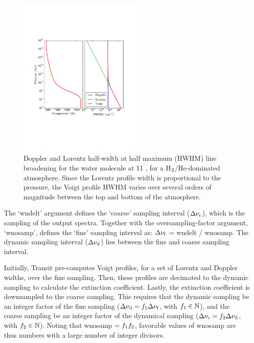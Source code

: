 \documentclass[letterpaper, 12pt]{article}
\begin{document}
\begin{figure}[htb]
\centerline{
\includegraphics[width=0.55\textwidth, clip]{figs/widths.pdf}}
\caption{\small \label{fig:broadening} Doppler and Lorentz half-width
  at half maximum (HWHM) line broadening for the water molecule at 11
  {\microns}, for a H$\sb{2}$/He-dominated atmosphere.  Since the
  Lorentz profile width is proportional to the pressure, the Voigt
  profile HWHM varies over several orders of magnitude between the top
  and bottom of the atmosphere.}
\end{figure}

The `{\tttb wndelt}' argument defines the `coarse' sampling interval
($\Delta\nu\sb{\rm c}$), which is the sampling of the output spectra.
Together with the oversampling-factor argument, `{\tttb wnosamp}',
{\transit} defines the `fine' sampling interval as: $\Delta\nu\sb{\rm
  f}$ = {\tttb wndelt / wnosamp}.  The dynamic sampling interval
($\Delta\nu\sb{\rm d}$) lies between the fine and coarse sampling
interval.

Initially, Transit pre-computes Voigt profiles, for a set of Lorentz
and Doppler widths, over the fine sampling.  Then, these profiles are
decimated to the dynamic sampling to calculate the extinction
coefficient.  Lastly, the extinction coefficient is downsampled to the
coarse sampling.  This requires that the dynamic sampling be an
integer factor of the fine sampling ($\Delta\nu\sb{\rm d} =
f\sb{1}\Delta\nu\sb{\rm f}$, with $f\sb{1}\in\mathbb{N}$), and the
coarse sampling be an integer factor of the dynamical sampling
($\Delta\nu\sb{\rm c} = f\sb{2}\Delta\nu\sb{\rm d}$, with
$f\sb{2}\in\mathbb{N}$).  Noting that {\tttb wnosamp} $=
f\sb{1}f\sb{2}$, favorable values of {\tttb wnosamp} are thus numbers
with a large number of integer divisors.
\end{document}

